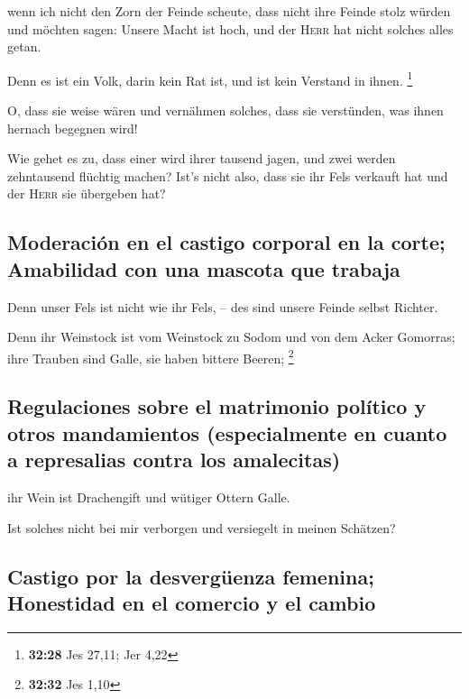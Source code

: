  wenn ich nicht den Zorn der Feinde scheute, dass nicht
ihre Feinde stolz würden und möchten sagen: Unsere Macht ist hoch, und
der \textsc{Herr} hat nicht solches alles getan.

 Denn es ist ein Volk, darin kein Rat ist, und ist kein
Verstand in ihnen. \footnote{\textbf{32:28} Jes 27,11; Jer 4,22}

 O, dass sie weise wären und vernähmen solches, dass sie
verstünden, was ihnen hernach begegnen wird!

 Wie gehet es zu, dass einer wird ihrer tausend jagen,
und zwei werden zehntausend flüchtig machen? Ist's nicht also, dass sie
ihr Fels verkauft hat und der \textsc{Herr} sie übergeben hat?

\hypertarget{moderaciuxf3n-en-el-castigo-corporal-en-la-corte-amabilidad-con-una-mascota-que-trabaja}{%
\subsection{Moderación en el castigo corporal en la corte; Amabilidad
con una mascota que
trabaja}\label{moderaciuxf3n-en-el-castigo-corporal-en-la-corte-amabilidad-con-una-mascota-que-trabaja}}

 Denn unser Fels ist nicht wie ihr Fels, -- des sind
unsere Feinde selbst Richter.

 Denn ihr Weinstock ist vom Weinstock zu Sodom und von
dem Acker Gomorras; ihre Trauben sind Galle, sie haben bittere Beeren;
\footnote{\textbf{32:32} Jes 1,10}

\hypertarget{regulaciones-sobre-el-matrimonio-poluxedtico-y-otros-mandamientos-especialmente-en-cuanto-a-represalias-contra-los-amalecitas}{%
\subsection{Regulaciones sobre el matrimonio político y otros
mandamientos (especialmente en cuanto a represalias contra los
amalecitas)}\label{regulaciones-sobre-el-matrimonio-poluxedtico-y-otros-mandamientos-especialmente-en-cuanto-a-represalias-contra-los-amalecitas}}

 ihr Wein ist Drachengift und wütiger Ottern Galle.

 Ist solches nicht bei mir verborgen und versiegelt in
meinen Schätzen?

\hypertarget{castigo-por-la-desverguxfcenza-femenina-honestidad-en-el-comercio-y-el-cambio}{%
\subsection{Castigo por la desvergüenza femenina; Honestidad en el
comercio y el
cambio}\label{castigo-por-la-desverguxfcenza-femenina-honestidad-en-el-comercio-y-el-cambio}}

